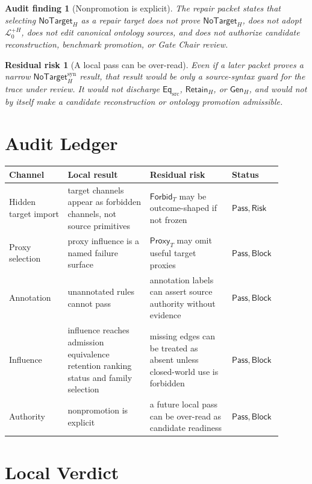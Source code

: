 \documentclass[11pt]{article}
\newcommand{\LangPlus}{\mathcal{L}_{0}^{+H}}
\newcommand{\GenH}{\mathsf{Gen}_{H}}
\newcommand{\EqSrc}{\mathsf{Eq}_{\mathrm{src}}}
\newcommand{\RetainH}{\mathsf{Retain}_{H}}
\newcommand{\NoTargetH}{\mathsf{NoTarget}_{H}}
\newcommand{\NoTargetSyn}{\mathsf{NoTarget}_{H}^{\mathrm{syn}}}
\newcommand{\ForbidT}{\mathsf{Forbid}_{T}}
\newcommand{\ProxyT}{\mathsf{Proxy}_{T}}
\newcommand{\Pass}{\mathsf{Pass}}
\newcommand{\Block}{\mathsf{Block}}
\newcommand{\Risk}{\mathsf{Risk}}
\newtheorem{auditfinding}{Audit finding}
\newtheorem{residualrisk}{Residual risk}
\begin{document}
\begin{auditfinding}[Nonpromotion is explicit]
The repair packet states that selecting \(\NoTargetH\) as a repair target
does not prove \(\NoTargetH\), does not adopt \(\LangPlus\), does not edit
canonical ontology sources, and does not authorize candidate reconstruction,
benchmark promotion, or Gate Chair review.
\end{auditfinding}

\begin{residualrisk}[A local pass can be over-read]
Even if a later packet proves a narrow \(\NoTargetSyn\) result, that result
would be only a source-syntax guard for the trace under review. It would not
discharge \(\EqSrc\), \(\RetainH\), or \(\GenH\), and would not by itself
make a candidate reconstruction or ontology promotion admissible.
\end{residualrisk}

\section{Audit Ledger}

\begin{center}
\begin{tabular}{p{0.2\linewidth}p{0.29\linewidth}p{0.29\linewidth}p{0.12\linewidth}}
\textbf{Channel} & \textbf{Local result} & \textbf{Residual risk} & \textbf{Status} \\
\hline
Hidden target import & target channels appear as forbidden channels, not source primitives & \(\ForbidT\) may be outcome-shaped if not frozen & \(\Pass,\Risk\) \\
Proxy selection & proxy influence is a named failure surface & \(\ProxyT\) may omit useful target proxies & \(\Pass,\Block\) \\
Annotation & unannotated rules cannot pass & annotation labels can assert source authority without evidence & \(\Pass,\Block\) \\
Influence & influence reaches admission equivalence retention ranking status and family selection & missing edges can be treated as absent unless closed-world use is forbidden & \(\Pass,\Block\) \\
Authority & nonpromotion is explicit & a future local pass can be over-read as candidate readiness & \(\Pass,\Block\) \\
\end{tabular}
\end{center}

\section{Local Verdict}
\end{document}
